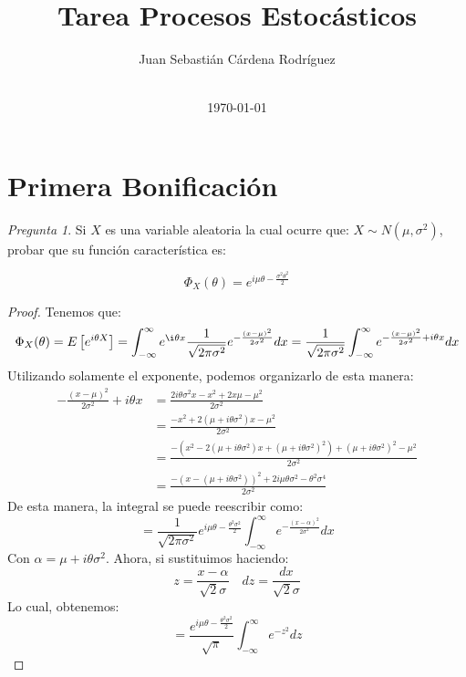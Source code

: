 \documentclass[11pt]{article}
\title{Tarea Procesos Estocásticos}
\author{Juan Sebasti\'an C\'ardena Rodríguez \\ \scalebox{0.7}{Ingeniería Matemática, Universidad EAFIT} \\ \scalebox{0.7}{201710008101}}
\date{\today}
\theoremstyle{definition}
\theoremstyle{remark}
\theoremstyle{remark}
\newtheorem{question}{Pregunta}
\begin{document}
\maketitle
\section*{Primera Bonificación}
\begin{question}
  Si $X$ es una variable aleatoria la cual ocurre que: $X \sim N(\mu, \sigma^2)$, probar que su
  función característica es:

  \begin{equation*}
    \Phi_X(\theta) = e^{i\mu\theta - \frac{\sigma^2\theta^2}{2}}
  \end{equation*}
\end{question}

\begin{proof}
  Tenemos que:
  \begin{equation*}
    \Phi_X(\theta) = E\left[e^{i\theta X}\right] = \int_{-\infty}^\infty
    e^{\i \theta x} \frac{1}{\sqrt{2\pi\sigma^2}} e^{-\frac{(x-\mu)^2}
      {2\sigma^2}}dx = \frac{1}{\sqrt{2\pi\sigma^2}}
    \int_{-\infty}^\infty e^{-\frac{(x-\mu)^2}{2\sigma^2} + i\theta x}dx
  \end{equation*}
  Utilizando solamente el exponente, podemos organizarlo de esta
  manera:
  \begin{equation*}
    \begin{split}
      -\frac{(x - \mu)^2}{2\sigma^2} + i\theta x &= \frac{2i\theta
        \sigma^2x - x^2 + 2x\mu - \mu^2}{2\sigma^2} \\
      &= \frac{-x^2 + 2(\mu + i\theta\sigma^2)x - \mu^2}{2\sigma^2} \\
      &= \frac{-(x^2 - 2(\mu + i\theta\sigma^2)x + (\mu + i\theta
        \sigma^2)^2) + (\mu + i\theta\sigma^2)^2 - \mu^2}{2\sigma^2}
      \\
      &= \frac{-(x - (\mu + i\theta\sigma^2))^2 + 2i\mu\theta\sigma^2
      - \theta^2\sigma^4}{2\sigma^2}
    \end{split}
  \end{equation*}
  De esta manera, la integral se puede reescribir como:
  \begin{equation*}
    = \frac{1}{\sqrt{2\pi\sigma^2}}e^{i\mu\theta -\frac{\theta^2
        \sigma^2}{2}}\int_{-\infty}^\infty e^{-\frac{(x - \alpha)^2}
      {2\sigma^2}}dx
  \end{equation*}
  Con $\alpha = \mu + i\theta\sigma^2$. Ahora, si sustituimos
  haciendo:
  \begin{equation*}
    z = \frac{x - \alpha}{\sqrt{2}\sigma} \quad dz = \frac{dx}
    {\sqrt{2}\sigma}
  \end{equation*}
  Lo cual, obtenemos:
  \begin{equation*}
    = \frac{e^{i\mu\theta -\frac{\theta^2\sigma^2}{2}}}{\sqrt{\pi}}
    \int_{-\infty}^\infty e^{-z^2}dz
  \end{equation*}


\end{proof}
\end{document}
